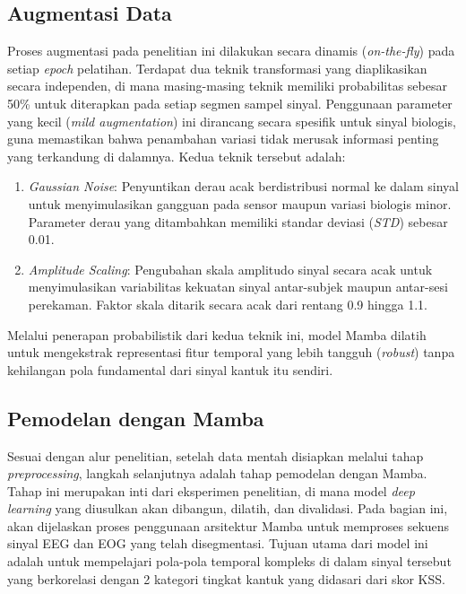 \subsection{Augmentasi Data} \label{III.Langkah6}
Proses augmentasi pada penelitian ini dilakukan secara dinamis (\textit{on-the-fly}) pada setiap \textit{epoch} pelatihan. Terdapat dua teknik transformasi yang diaplikasikan secara independen, di mana masing-masing teknik memiliki probabilitas sebesar 50\% untuk diterapkan pada setiap segmen sampel sinyal. Penggunaan parameter yang kecil (\textit{mild augmentation}) ini dirancang secara spesifik untuk sinyal biologis, guna memastikan bahwa penambahan variasi tidak merusak informasi penting yang terkandung di dalamnya. Kedua teknik tersebut adalah:
\begin{enumerate}
    \item \textit{Gaussian Noise}: Penyuntikan derau acak berdistribusi normal ke dalam sinyal untuk menyimulasikan gangguan pada sensor maupun variasi biologis minor. Parameter derau yang ditambahkan memiliki standar deviasi (\textit{STD}) sebesar 0.01.
    \item \textit{Amplitude Scaling}: Pengubahan skala amplitudo sinyal secara acak untuk menyimulasikan variabilitas kekuatan sinyal antar-subjek maupun antar-sesi perekaman. Faktor skala ditarik secara acak dari rentang 0.9 hingga 1.1.
\end{enumerate}

Melalui penerapan probabilistik dari kedua teknik ini, model Mamba dilatih untuk mengekstrak representasi fitur temporal yang lebih tangguh (\textit{robust}) tanpa kehilangan pola fundamental dari sinyal kantuk itu sendiri.

\subsection{Pemodelan dengan Mamba} \label{III.Langkah7}

Sesuai dengan alur penelitian, setelah data mentah disiapkan melalui tahap \textit{preprocessing}, langkah selanjutnya adalah tahap pemodelan dengan Mamba. Tahap ini merupakan inti dari eksperimen penelitian, di mana model \textit{deep learning} yang diusulkan akan dibangun, dilatih, dan divalidasi. Pada bagian ini, akan dijelaskan proses penggunaan arsitektur Mamba untuk memproses sekuens sinyal EEG dan EOG yang telah disegmentasi. Tujuan utama dari model ini adalah untuk mempelajari pola-pola temporal kompleks di dalam sinyal tersebut yang berkorelasi dengan 2 kategori tingkat kantuk yang didasari dari skor KSS.

